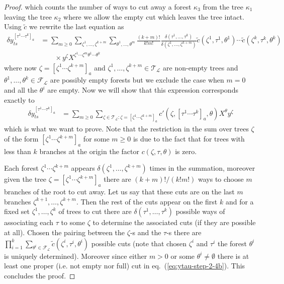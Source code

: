 \documentclass[a4paper,11pt,reqno]{article}
\newcommand{\1}{{\bf 1}}
\newcommand{\der}{\delta}
\newcommand{\FF}{\mathcal{F}}
\newcommand{\LL}{\mathcal{L}}
\newcommand{\TT}{\mathcal{T}}
\begin{document}
\begin{proof}
which counts the number of ways to cut away a forest $\kappa_3$ from the tree $\kappa_1$ leaving the tree $\kappa_2$ where we allow the empty cut which leaves the tree intact. Using $\tilde c$ we rewrite the last equation as
\begin{equation}
  \label{eq:ytau-step-2-4b}
  \begin{split}
 \der y^{[\tau^1 \cdots \tau^k]_a}_{ts} & =  \sum_{m \ge 0} \sum_{\zeta^1,\dots,\zeta^{k+m}} \sum_{\theta^1,\dots,\theta^m}
\frac{(k+m)!}{k!m!} \frac{\delta(\tau^1,\dots,\tau^k)}{\delta(\zeta^1,\dots,\zeta^{k+m})} \tilde c(\zeta^1,\tau^1,\theta^1) \cdots \tilde c(\zeta^k,\tau^k,\theta^k)
\\ & \qquad \times y^{\zeta} X^{\zeta^1 \cdots \zeta^{m} \theta^1 \cdots \theta^k}
   \end{split}
 \end{equation}
where now $\zeta = [\zeta^1\cdots \zeta^{k+m}]_a$ and $\zeta^1,\dots,\zeta^{k+m} \in \TT_\LL$ are non-empty trees and $\theta^1,\dots,\theta^k \in \FF_\LL$ are possibly empty forests but we exclude the case when $m=0$ and all the $\theta^i$ are empty. Now we will show that this expression corresponds exactly to
\begin{equation}
  \label{eq:ytau-step-2-5}
  \begin{split}
 \der y^{[\tau^1 \cdots \tau^k]_a}_{ts} & =  \sum_{m \ge 0} \sum_{\zeta \in \TT_\LL : \zeta = [\zeta^1\cdots \zeta^{k+m}]_a} c'(\zeta,[\tau^1 \cdots \tau^k]_a,\theta)  X^{\theta} y^\zeta
   \end{split}
 \end{equation}
which is what we want to prove. Note that the restriction in the sum over trees $\zeta$ of the form $[\zeta^1\cdots \zeta^{k+m}]_a$ for some $m \ge 0$ is due to the fact that for trees with less than $k$ branches at the origin the factor $c(\zeta,\tau,\theta)$ is zero.

 Each forest $\zeta^1\cdots \zeta^{k+m}$ appears
 $\delta(\zeta^1,\dots,\zeta^{k+m})$ times in the summation, moreover
 given the tree $\zeta = [\zeta^1\cdots \zeta^{k+m}]_a$ there are
 $(k+m)!/(k!m!)$ ways to choose $m$ branches of the root to cut
 away. Let us say that these cuts are on the last $m$ branches
 $\zeta^{k+1},\dots,\zeta^{k+m}$. Then the rest of the cuts appear on
 the first $k$ and for a fixed set $\zeta^1,\dots,\zeta^k$ of trees to
 cut there are $\delta(\tau^1,\dots,\tau^k)$ possible ways of
 associating each $\tau$ to some $\zeta$ to determine the associated
 cuts (if they are possible at all). Chosen the pairing between the
 $\zeta$-s and the $\tau$-s there are $\prod_{i=1}^k \sum_{\theta^i
   \in \FF_\LL} \tilde c(\zeta^i,\tau^i,\theta^i)$ possible cuts (note
 that chosen $\zeta^i$ and $\tau^i$ the forest $\theta^i$ is uniquely
 determined). Moreover since either $m> 0$ or some $\theta^i \neq
 \emptyset$ there is at least one proper (i.e. not empty nor full) cut
 in eq.~(\ref{eq:ytau-step-2-4b}). This concludes the proof.

\end{proof}
\end{document}
